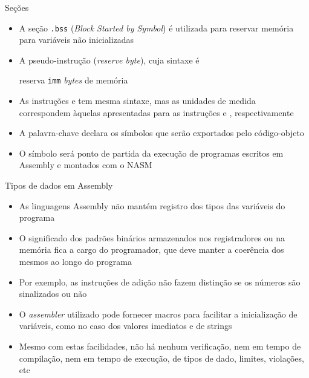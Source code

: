 \begin{frame}[fragile]{Seções}

    \begin{itemize}
        \item A seção \texttt{.bss} (\textit{Block Started by Symbol}) é utilizada para reservar
            memória para variáveis não inicializadas

        \item A pseudo-instrução  (\textit{reserve byte}), cuja sintaxe é


        reserva \texttt{imm} \textit{bytes} de memória

        \item As instruções  e  tem mesma sintaxe, mas
            as unidades de medida correspondem àquelas apresentadas para as instruções
             e , respectivamente

        \item A palavra-chave  declara os símbolos que serão exportados pelo
            código-objeto

        \item O símbolo  será ponto de partida da execução de programas
            escritos em Assembly e montados com o NASM
    \end{itemize}

\end{frame}

\begin{frame}[fragile]{Tipos de dados em Assembly}

    \begin{itemize}
        \item As linguagens Assembly não mantém registro dos tipos das variáveis do programa

        \item O significado dos padrões binários armazenados nos registradores ou na memória
            fica a cargo do programador, que deve manter a coerência dos mesmos ao longo do
            programa

        \item Por exemplo, as instruções de adição não fazem distinção se os números são
            sinalizados ou não

        \item O \textit{assembler} utilizado pode fornecer macros para facilitar a inicialização
            de variáveis, como no caso dos valores imediatos e de strings

        \item Mesmo com estas facilidades, não há nenhum verificação, nem em tempo de compilação,
            nem em tempo de execução, de tipos de dado, limites, violações, etc
    \end{itemize}

\end{frame}

